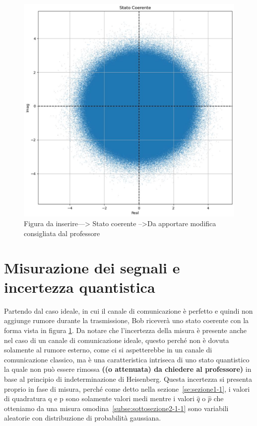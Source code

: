 \begin{figure}[h] 
\begin{center}
\includegraphics[scale=0.4]{figure/stato_coerente.eps}
\end{center}
\caption{Figura da inserire---> Stato coerente -->Da apportare modifica consigliata dal professore} \label{fig:stato-coerente}
\end{figure}

\section{Misurazione dei segnali e incertezza quantistica}
Partendo dal caso ideale, in cui il canale di comunicazione \`e perfetto e quindi non aggiunge rumore durante la trasmissione, Bob ricever\`a uno stato coerente con la forma vista in figura \ref{fig:stato-coerente}. Da notare che l'incertezza della misura \`e presente anche nel caso di un canale di comunicazione ideale, questo perch\'e non \`e dovuta solamente al rumore esterno, come ci si aspetterebbe in un canale di comunicazione classico, ma \`e una caratteristica intriseca di uno stato quantistico la quale non pu\`o essere rimossa \textbf{((o attenuata) da chiedere al professore)} in base al principio di indeterminazione di Heisenberg. Questa incertezza si presenta proprio in fase di misura, perch\'e come detto nella sezione~\ref{se:sezione1-1}, i valori di quadratura q e p sono solamente valori medi mentre i valori $\hat q$ o $\hat p$ che otteniamo da una misura omodina~\ref{subse:sottosezione2-1-1} sono variabili aleatorie con distribuzione di probabilit\`a gaussiana. 

